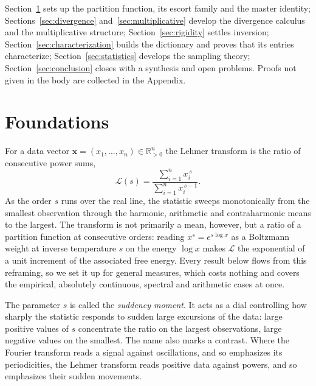 \documentclass[sn-mathphys-num]{sn-jnl}
\theoremstyle{thmstyleone}%
\theoremstyle{thmstyletwo}%
\theoremstyle{thmstylethree}%
\theoremstyle{thmstyleone}%
\providecommand{\Rpos}{\mathbb{R}_{>0}}
\providecommand{\Leh}{\mathscr{L}}
\providecommand{\xv}{\mathbf{x}}
\begin{document}
	Section~\ref{sec:foundations} sets up the partition function, its
	escort family and the master identity;
	Sections~\ref{sec:divergence} and~\ref{sec:multiplicative} develop
	the divergence calculus and the multiplicative structure;
	Section~\ref{sec:rigidity} settles inversion;
	Section~\ref{sec:characterization} builds the dictionary and proves
	that its entries characterize; Section~\ref{sec:statistics} develops
	the sampling theory; Section~\ref{sec:conclusion} closes with a
	synthesis and open problems. Proofs not given in the body are
	collected in the Appendix.
	
	\section{Foundations}\label{sec:foundations}
	
	For a data vector $\xv=(x_1,\dots,x_n)\in\Rpos^n$ the Lehmer
	transform is the ratio of consecutive power sums,
	\begin{equation}\label{eq:defdata}
		\Leh(s)=\frac{\sum_{i=1}^{n}x_i^{\,s}}
		{\sum_{i=1}^{n}x_i^{\,s-1}} .
	\end{equation}
	As the order $s$ runs over the real line, the statistic sweeps
	monotonically from the smallest observation through the harmonic,
	arithmetic and contraharmonic means to the largest. The transform
	is not primarily a mean, however, but a ratio of a partition
	function at consecutive orders: reading $x^{s}=e^{s\log x}$ as a
	Boltzmann weight at inverse temperature $s$ on the energy $\log x$
	makes $\Leh$ the exponential of a unit increment of the associated
	free energy. Every result below flows from this reframing, so we
	set it up for general measures, which costs nothing and covers the
	empirical, absolutely continuous, spectral and arithmetic cases at
	once.
	
	The parameter $s$ is called the \emph{suddency moment}. It acts as
	a dial controlling how sharply the statistic responds to sudden
	large excursions of the data: large positive values of $s$
	concentrate the ratio on the largest observations, large negative
	values on the smallest. The name also marks a contrast. Where the
	Fourier transform reads a signal against oscillations, and so
	emphasizes its periodicities, the Lehmer transform reads positive
	data against powers, and so emphasizes their sudden movements.
	
\end{document}
